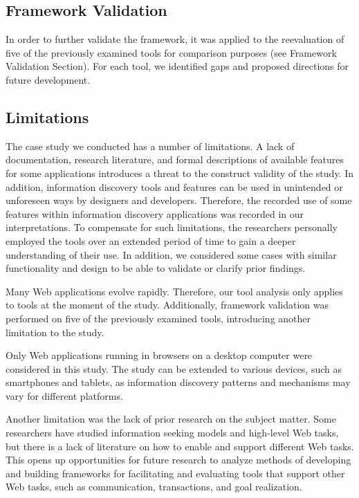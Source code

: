 \documentclass{sigchi}
\begin{document}
{\subsection{Framework Validation}
\label{subsection:validating}
In order to further validate the framework, it was applied to the reevaluation of five of the previously examined tools for comparison purposes (see Framework Validation Section). For each tool, we identified gaps and proposed directions for future development. 
}%

{\subsection{Limitations}
The case study we conducted has a number of limitations. A lack of documentation, research literature, and formal descriptions of available features for some applications introduces a threat to the construct validity of the study. In addition, information discovery tools and features can be used in unintended or unforeseen ways by designers and developers. Therefore, the recorded use of some features within information discovery applications was recorded in our interpretations. To compensate for such limitations, the researchers personally employed the tools over an extended period of time to gain a deeper understanding of their use. In addition, we considered some cases with similar functionality and design to be able to validate or clarify prior findings. 

Many Web applications evolve rapidly. Therefore, our tool analysis only applies to tools at the moment of the study. Additionally, framework validation was performed on five of the previously examined tools, introducing another limitation to the study. 

Only Web applications running in browsers on a desktop computer were considered in this study. The study can be extended to various devices, such as smartphones and tablets, as information discovery patterns and mechanisms may vary for different platforms. 

Another limitation was the lack of prior research on the subject matter. Some researchers have studied information seeking models and high-level Web tasks, but there is a lack of literature on how to enable and support different Web tasks. This opens up opportunities for future research to analyze methods of developing and building frameworks for facilitating and evaluating tools that support other Web tasks, such as communication, transactions, and goal realization.
}
\end{document}

